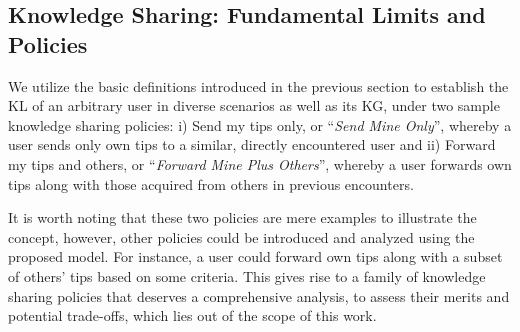 \documentclass[12pt,epsf]{article}
\theoremstyle{definition}
\begin{document}
\subsection{Knowledge Sharing: Fundamental Limits and Policies}
\vspace{-0.2 cm}
We utilize the basic definitions introduced in the previous section to establish the KL of an arbitrary user in diverse scenarios as well as its KG, under two sample knowledge sharing policies:
i) Send my tips only, or ``{\it Send Mine Only}'', whereby a user sends only own 
tips to a similar, directly encountered user and ii) Forward my tips and others, or ``{\it Forward Mine Plus Others}'', whereby a user forwards own tips along with those acquired from others in previous encounters.

It is worth noting that these two policies are mere examples to illustrate the concept, however, other policies could be introduced and analyzed using the proposed model.
For instance, a user could forward own tips along with a subset of others' tips based on some criteria. This gives rise to a family of knowledge sharing policies that deserves a comprehensive analysis, to assess their merits and potential trade-offs, which lies out of the scope of this work. 
%
\end{document}
